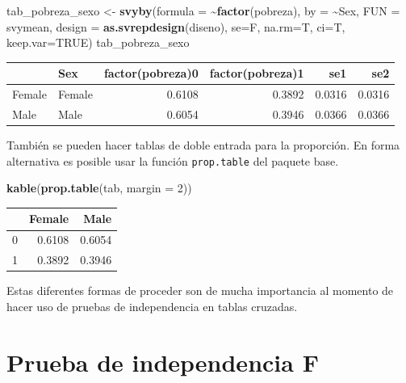 \documentclass[
  12pt,
]{book}
\newenvironment{Shaded}{\begin{snugshade}}{\end{snugshade}}
\newcommand{\AttributeTok}[1]{\textcolor[rgb]{0.13,0.29,0.53}{#1}}
\newcommand{\ConstantTok}[1]{\textcolor[rgb]{0.56,0.35,0.01}{#1}}
\newcommand{\DecValTok}[1]{\textcolor[rgb]{0.00,0.00,0.81}{#1}}
\newcommand{\FunctionTok}[1]{\textcolor[rgb]{0.13,0.29,0.53}{\textbf{#1}}}
\newcommand{\NormalTok}[1]{#1}
\newcommand{\OtherTok}[1]{\textcolor[rgb]{0.56,0.35,0.01}{#1}}
\newcommand{\SpecialCharTok}[1]{\textcolor[rgb]{0.81,0.36,0.00}{\textbf{#1}}}
\begin{document}
\begin{Shaded}
\begin{Highlighting}[]
\NormalTok{tab\_pobreza\_sexo }\OtherTok{\textless{}{-}} \FunctionTok{svyby}\NormalTok{(}\AttributeTok{formula =} \SpecialCharTok{\textasciitilde{}}\FunctionTok{factor}\NormalTok{(pobreza), }
                          \AttributeTok{by =} \SpecialCharTok{\textasciitilde{}}\NormalTok{Sex,}
                          \AttributeTok{FUN =}\NormalTok{ svymean, }
                          \AttributeTok{design =} \FunctionTok{as.svrepdesign}\NormalTok{(diseno), }
                          \AttributeTok{se=}\NormalTok{F, }\AttributeTok{na.rm=}\NormalTok{T, }\AttributeTok{ci=}\NormalTok{T, }\AttributeTok{keep.var=}\ConstantTok{TRUE}\NormalTok{)}
\NormalTok{tab\_pobreza\_sexo}
\end{Highlighting}
\end{Shaded}

\begin{tabular}{l|l|r|r|r|r}
\hline
  & Sex & factor(pobreza)0 & factor(pobreza)1 & se1 & se2\\
\hline
Female & Female & 0.6108 & 0.3892 & 0.0316 & 0.0316\\
\hline
Male & Male & 0.6054 & 0.3946 & 0.0366 & 0.0366\\
\hline
\end{tabular}

También se pueden hacer tablas de doble entrada para la proporción.
En forma alternativa es posible usar la función \texttt{prop.table} del paquete base.

\begin{Shaded}
\begin{Highlighting}[]
\FunctionTok{kable}\NormalTok{(}\FunctionTok{prop.table}\NormalTok{(tab, }\AttributeTok{margin =} \DecValTok{2}\NormalTok{))}
\end{Highlighting}
\end{Shaded}

\begin{tabular}{l|r|r}
\hline
  & Female & Male\\
\hline
0 & 0.6108 & 0.6054\\
\hline
1 & 0.3892 & 0.3946\\
\hline
\end{tabular}

Estas diferentes formas de proceder son de mucha importancia al momento de hacer uso de pruebas de independencia en tablas cruzadas.

\section{Prueba de independencia F}\label{prueba-de-independencia-f}
\end{document}
